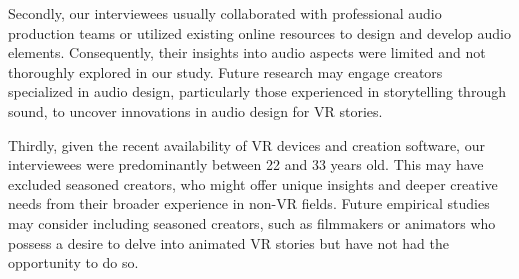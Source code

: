 Secondly, our interviewees usually collaborated with professional audio production teams or utilized existing online resources to design and develop audio elements. Consequently, their insights into audio aspects were limited and not thoroughly explored in our study. Future research may engage creators specialized in audio design, particularly those experienced in storytelling through sound, to uncover innovations in audio design for VR stories.

Thirdly, given the recent availability of VR devices and creation software, our interviewees were predominantly between 22 and 33 years old. This may have excluded seasoned creators, who might offer unique insights and deeper creative needs from their broader experience in non-VR fields. Future empirical studies may consider including seasoned creators, such as filmmakers or animators who possess a desire to delve into animated VR stories but have not had the opportunity to do so.
